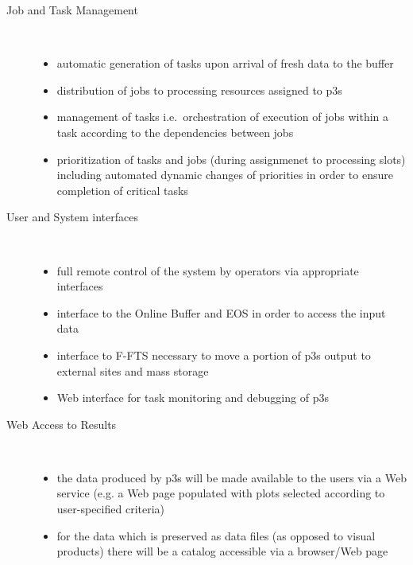 \documentclass[pdftex,12pt,letter]{article}
\begin{document}
\begin{description}
\item[Job and Task Management]\ 
\begin{itemize}

\item automatic generation of tasks upon arrival of fresh data to the buffer

\item distribution of jobs to processing resources assigned to p3s

\item management of tasks i.e.~orchestration of execution of jobs within
a task according to the dependencies between jobs

\item prioritization of tasks and jobs (during assignmenet to processing slots)
 including automated dynamic changes of priorities in order to ensure completion
of critical tasks

\end{itemize} 

\item[User and System interfaces]\ 
\begin{itemize}

\item full remote control of the system by operators via appropriate interfaces

\item interface to the Online Buffer and EOS in order to access the input data

\item interface to F-FTS necessary to move a portion of p3s output to external
sites and mass storage

\item Web interface for task monitoring and debugging of p3s


\end{itemize} 

\item[Web Access to Results]\ 
\begin{itemize}

\item the data produced by p3s will be made available to the users via a Web service
(e.g. a Web page populated with plots selected according to user-specified criteria)

\item for the data which is preserved as data files (as opposed to visual products)
there will be a catalog accessible via a browser/Web page


\end{itemize}
\end{description}
\end{document}
